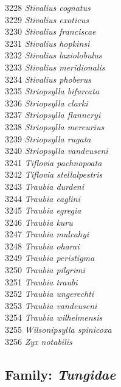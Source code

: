 \documentclass[
]{article}
\begin{document}
3228 \emph{Stivalius cognatus}\\
3229 \emph{Stivalius exoticus}\\
3230 \emph{Stivalius franciscae}\\
3231 \emph{Stivalius hopkinsi}\\
3232 \emph{Stivalius laxiolobulus}\\
3233 \emph{Stivalius meridionalis}\\
3234 \emph{Stivalius phoberus}\\
3235 \emph{Striopsylla bifurcata}\\
3236 \emph{Striopsylla clarki}\\
3237 \emph{Striopsylla flanneryi}\\
3238 \emph{Striopsylla mercurius}\\
3239 \emph{Striopsylla rugata}\\
3240 \emph{Striopsylla vandeuseni}\\
3241 \emph{Tiflovia pachnopoata}\\
3242 \emph{Tiflovia stellalpestris}\\
3243 \emph{Traubia durdeni}\\
3244 \emph{Traubia eaglini}\\
3245 \emph{Traubia egregia}\\
3246 \emph{Traubia kuru}\\
3247 \emph{Traubia mulcahyi}\\
3248 \emph{Traubia oharai}\\
3249 \emph{Traubia peristigma}\\
3250 \emph{Traubia pilgrimi}\\
3251 \emph{Traubia traubi}\\
3252 \emph{Traubia ungerechti}\\
3253 \emph{Traubia vandeuseni}\\
3254 \emph{Traubia wilhelmensis}\\
3255 \emph{Wilsonipsylla spinicoxa}\\
3256 \emph{Zyx notabilis}

\hypertarget{family-tungidae}{%
\subsection{\texorpdfstring{Family:
\emph{Tungidae}}{Family: Tungidae}}\label{family-tungidae}}
\end{document}
